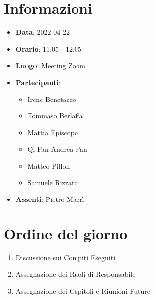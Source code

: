 \section{Informazioni}
	\begin{itemize}
		\item \textbf{Data}: 2022-04-22     %
		\item \textbf{Orario}: 11:05 - 12:05             %
		\item \textbf{Luogo}: Meeting Zoom
		\item \textbf{Partecipanti}:
		\begin{itemize}
			\item Irene Benetazzo
			\item Tommaso Berlaffa
			\item Mattia Episcopo
			\item Qi Fan Andrea Pan
			\item Matteo Pillon
			\item Samuele Rizzato
		\end{itemize}
        \item \textbf{Assenti}: Pietro Macrì
	\end{itemize}
    
	\section{Ordine del giorno}
	\begin{enumerate}
		\item Discussione sui Compiti Eseguiti
		\item Assegnazione dei Ruoli di Responsabile
		\item Assegnazione dei Capitoli e Riunioni Future
	\end{enumerate}
	\newpage